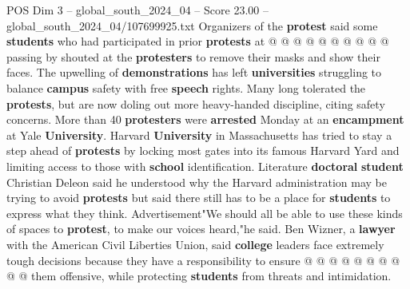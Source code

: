 \begin{textsample}{POS Dim 3 – global\_south\_2024\_04 – Score 23.00 – global\_south\_2024\_04/107699925.txt}
Organizers of the \textbf{protest} said some \textbf{students} who had participated in prior \textbf{protests} at @ @ @ @ @ @ @ @ @ @ passing by shouted at the \textbf{protesters} to remove their masks and show their faces.
The upwelling of \textbf{demonstrations} has left \textbf{universities} struggling to balance \textbf{campus} safety with free \textbf{speech} rights.
Many long tolerated the \textbf{protests}, but are now doling out more heavy-handed discipline, citing safety concerns.
More than 40 \textbf{protesters} were \textbf{arrested} Monday at an \textbf{encampment} at Yale \textbf{University}.
Harvard \textbf{University} in Massachusetts has tried to stay a step ahead of \textbf{protests} by locking most gates into its famous Harvard Yard and limiting access to those with \textbf{school} identification.
Literature \textbf{doctoral} \textbf{student} Christian Deleon said he understood why the Harvard administration may be trying to avoid \textbf{protests} but said there still has to be a place for \textbf{students} to express what they think.
Advertisement"We should all be able to use these kinds of spaces to \textbf{protest}, to make our voices heard,"he said.
Ben Wizner, a \textbf{lawyer} with the American Civil Liberties Union, said \textbf{college} leaders face extremely tough decisions because they have a responsibility to ensure @ @ @ @ @ @ @ @ @ @ them offensive, while protecting \textbf{students} from threats and intimidation.

\end{textsample}
